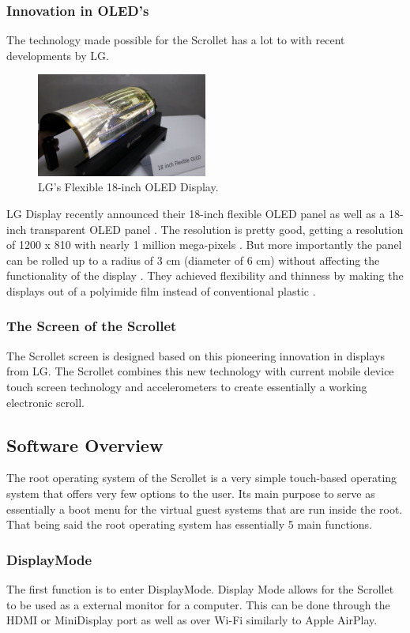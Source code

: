 \documentclass[a4paper]{article}
\begin{document}
\subsubsection{Innovation in OLED's}
The technology made possible for the Scrollet has a lot to with recent developments by LG.
\begin{figure}[H]
\centering
\includegraphics[width=0.5\textwidth]{lgoled.jpg}
\caption{LG's Flexible 18-inch OLED Display.}
\end{figure}
LG Display recently announced their 18-inch flexible OLED panel as well as a 18-inch transparent OLED panel \cite{LG}. The resolution is pretty good, getting a resolution of 1200 x 810  with nearly 1 million mega-pixels \cite{LG}. But more importantly the panel can be rolled up to a radius of 3 cm (diameter of 6 cm) without affecting the functionality of the display \cite{LG}. They achieved flexibility and thinness by making the displays out of a polyimide film instead of conventional plastic \cite{LG}.

\subsubsection{The Screen of the Scrollet}
The Scrollet screen is designed based on this pioneering innovation in displays from LG. The Scrollet combines this new technology with current mobile device touch screen technology and accelerometers to create essentially a working electronic scroll.

\subsection{Software Overview}
The root operating system of the Scrollet is a very simple touch-based operating system that offers very few options to the user. Its main purpose to serve as essentially a boot menu for the virtual guest systems that are run inside the root. That being said the root operating system has essentially 5 main functions.

\subsubsection{DisplayMode}
The first function is to enter DisplayMode. Display Mode allows for the Scrollet to be used as a external monitor for a computer. This can be done through the HDMI or MiniDisplay port as well as over Wi-Fi similarly to Apple AirPlay.
\end{document}
